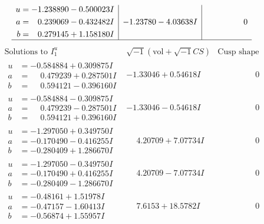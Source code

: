 \documentclass[1p]{elsarticle_modified}
\theoremstyle{definition}
\newcommand{\I}{\sqrt{-1}}
\begin{document}
$$\begin{array}{c|c|c}
\begin{aligned}
u &= -1.238890 - 0.500023 I \\
a &= \phantom{-}0.239069 - 0.432482 I \\
b &= \phantom{-}0.279145 + 1.158180 I\end{aligned}
 & -1.23780 - 4.03638 I & \phantom{-0.000000 } 0\\
 \hline 
 \end{array}$$\newpage$$\begin{array}{c|c|c}  
\text{Solutions to }I^u_{1}& \I (\text{vol} + \sqrt{-1}CS) & \text{Cusp shape}\\
 \hline 
\begin{aligned}
u &= -0.584884 + 0.309875 I \\
a &= \phantom{-}0.479239 + 0.287501 I \\
b &= \phantom{-}0.594121 - 0.396160 I\end{aligned}
 & -1.33046 + 0.54618 I & \phantom{-0.000000 } 0 \\ \hline\begin{aligned}
u &= -0.584884 - 0.309875 I \\
a &= \phantom{-}0.479239 - 0.287501 I \\
b &= \phantom{-}0.594121 + 0.396160 I\end{aligned}
 & -1.33046 - 0.54618 I & \phantom{-0.000000 } 0 \\ \hline\begin{aligned}
u &= -1.297050 + 0.349750 I \\
a &= -0.170490 - 0.416255 I \\
b &= -0.280409 + 1.286670 I\end{aligned}
 & \phantom{-}4.20709 + 7.07734 I & \phantom{-0.000000 } 0 \\ \hline\begin{aligned}
u &= -1.297050 - 0.349750 I \\
a &= -0.170490 + 0.416255 I \\
b &= -0.280409 - 1.286670 I\end{aligned}
 & \phantom{-}4.20709 - 7.07734 I & \phantom{-0.000000 } 0 \\ \hline\begin{aligned}
u &= -0.48161 + 1.51978 I \\
a &= -0.47157 - 1.60413 I \\
b &= -0.56874 + 1.55957 I\end{aligned}
 & \phantom{-}7.6153 + 18.5782 I & \phantom{-0.000000 } 0 \\ \hline\begin{aligned}

\end{aligned}
\end{array}$$
\end{document}
